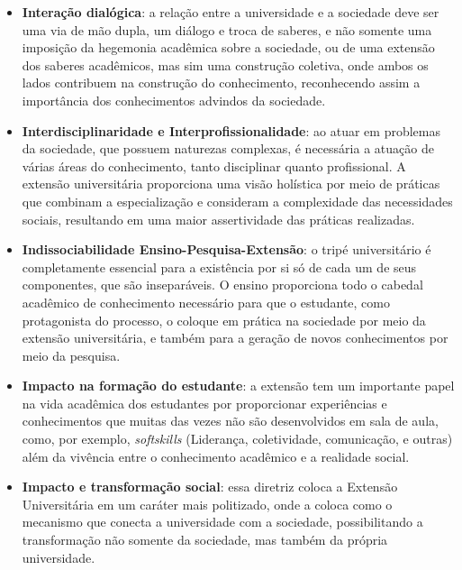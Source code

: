 \begin{itemize}
    \item \textbf{Interação dialógica}: a relação entre a universidade e a sociedade deve ser uma via de mão dupla, um diálogo e troca de saberes, e não somente uma imposição da hegemonia acadêmica sobre a sociedade, ou de uma extensão dos saberes acadêmicos, mas sim uma construção coletiva, onde ambos os lados contribuem na construção do conhecimento, reconhecendo assim a importância dos conhecimentos advindos da sociedade.
    \item \textbf{Interdisciplinaridade e Interprofissionalidade}: ao atuar em problemas da sociedade, que possuem naturezas complexas, é necessária a atuação de várias áreas do conhecimento, tanto disciplinar quanto profissional. A extensão universitária proporciona uma visão holística por meio de práticas que combinam a especialização e consideram a complexidade das necessidades sociais, resultando em uma maior assertividade das práticas realizadas.
    \item \textbf{Indissociabilidade Ensino-Pesquisa-Extensão}: o tripé universitário é completamente essencial para a existência por si só de cada um de seus componentes, que são inseparáveis. O ensino proporciona todo o cabedal acadêmico de conhecimento necessário para que o estudante, como protagonista do processo, o coloque em prática na sociedade por meio da extensão universitária, e também para a geração de novos conhecimentos por meio da pesquisa.
    \item \textbf{Impacto na formação do estudante}: a extensão tem um importante papel na vida acadêmica dos estudantes por proporcionar experiências e conhecimentos que muitas das vezes não são desenvolvidos em sala de aula, como, por exemplo, \textit{softskills} (Liderança, coletividade, comunicação, e outras) além da vivência entre o conhecimento acadêmico e a realidade social.
    \item \textbf{Impacto e transformação social}: essa diretriz coloca a Extensão Universitária em um caráter mais politizado, onde a coloca como o mecanismo que conecta a universidade com a sociedade, possibilitando a transformação não somente da sociedade, mas também da própria universidade.
\end{itemize}

